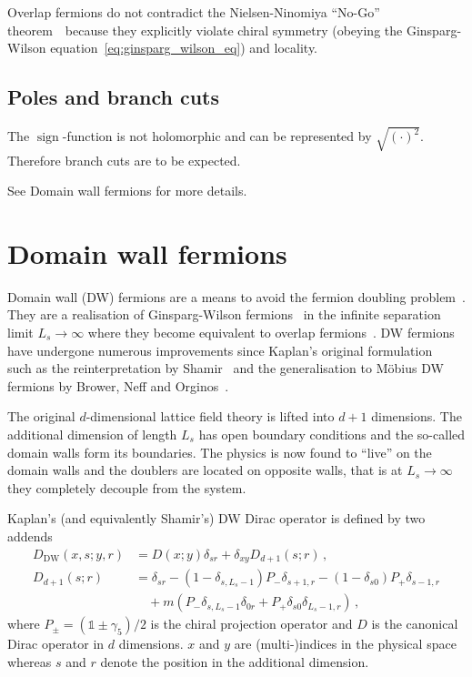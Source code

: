 \documentclass[a4paper]{article}
\DeclareMathOperator{\sign}{sign}
\newcommand{\nnt}{Nielsen-Ninomiya ``No-Go'' theorem~\cite{NIELSEN1981219}}
\begin{document}
	Overlap fermions do not contradict the \nnt\ because they explicitly violate chiral symmetry (obeying the Ginsparg-Wilson equation~\eqref{eq:ginsparg_wilson_eq}) and locality.
	
	\subsection{Poles and branch cuts}
	The $\sign$-function is not holomorphic and can be represented by $\sqrt{(\cdot)^2}$. Therefore branch cuts are to be expected.
	
	See Domain wall fermions for more details.
	
	\section{Domain wall fermions}
	Domain wall (DW) fermions are a means to avoid the fermion doubling problem~\cite{domain_walls_1992,Gattringer:2010zz}. They are a realisation of Ginsparg-Wilson fermions~\cite{Ginsparg_Wilson} in the infinite separation limit \mbox{$L_s\rightarrow\infty$} where they become equivalent to overlap fermions~\cite{Neuberger_DW_overlap}. DW fermions have undergone numerous improvements since Kaplan's original formulation~\cite{domain_walls_1992} such as the reinterpretation by Shamir~\cite{SHAMIR199390} and the generalisation to Möbius DW fermions by Brower, Neff and Orginos~\cite{BROWER2006191}.
	
	The original $d$-dimensional lattice field theory is lifted into $d+1$ dimensions. The additional dimension of length $L_s$ has open boundary conditions and the so-called domain walls form its boundaries. The physics is now found to ``live'' on the domain walls and the doublers are located on opposite walls, that is at $L_s\rightarrow\infty$ they completely decouple from the system.
	
	Kaplan's (and equivalently Shamir's) DW Dirac operator is defined by two addends
	\begin{align}
		D_\text{DW}(x,s;y,r) &= D(x;y)\delta_{sr} + \delta_{xy}D_{d+1}(s;r)\,,\\
		D_{d+1}(s;r) &= \delta_{sr} - (1-\delta_{s,L_s-1})P_-\delta_{s+1,r} - (1-\delta_{s0})P_+\delta_{s-1,r}\nonumber\\
		&\quad + m\left(P_-\delta_{s,L_s-1}\delta_{0r} + P_+\delta_{s0}\delta_{L_s-1,r}\right)\,,
	\end{align}
	where $P_\pm=(\mathds1\pm\gamma_5)/2$ is the chiral projection operator and $D$ is the canonical Dirac operator in $d$ dimensions. $x$ and $y$ are (multi-)indices in the physical space whereas $s$ and $r$ denote the position in the additional dimension.
	
\end{document}
